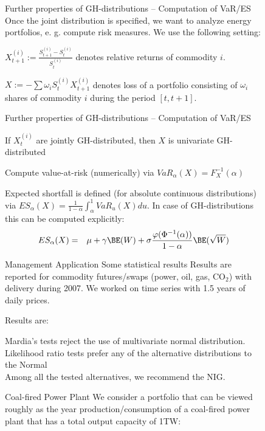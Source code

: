 \begin{figure}[htp]
\begin{center}
\par\end{center}

 Further properties of GH-distributions -- Computation of VaR/ES
Once the joint distribution is specified, we want to analyze energy
portfolios, e. g. compute risk measures. We use the following setting: 

$X_{t+1}^{(i)}:=\frac{S_{t+1}^{(i)}-S_{t}^{(i)}}{S_{t}^{(i)}}$ denotes
relative returns of commodity $i$. 

$X:=-\sum\omega_{i}S_{t}^{(i)}X_{t+1}^{(i)}$ denotes loss of a portfolio
consisting of $\omega_{i}$ shares of commodity $i$ during the period
$[t,t+1]$. 

 Further properties of GH-distributions -- Computation of VaR/ES 

If $X_{t}^{(i)}$ are jointly GH-distributed, then $X$ is univariate
GH-distributed 

Compute value-at-risk (numerically) via $VaR_{\alpha}(X)=F_{X}^{-1}(\alpha)$ 

Expected shortfall is defined (for absolute continuous distributions)
via $ES_{\alpha}(X)=\frac{1}{1-\alpha}\int_{\alpha}^{1}VaR_{u}(X)du$.
In case of GH-distributions this can be computed explicitly: 
\begin{eqnarray*}
ES_{\alpha}(X) & = & \mu+\gamma\BE(W)+\sigma\frac{\varphi(\Phi^{-1}(\alpha))}{1-\alpha}\BE(\sqrt{W})
\end{eqnarray*}




\subsubsectionRisk Management Application Some statistical results
Results are reported for commodity futures/swaps (power, oil, gas,
CO$_{2}$) with delivery during 2007. We worked on time series with
1.5 years of daily prices.

Results are: %


Mardia's tests reject the use of multivariate normal distribution.\\[-1.3cm] 

Likelihood ratio tests prefer any of the alternative distributions
to the Normal\\[-1.3cm] 

Among all the tested alternatives, we recommend the NIG. 



Coal-fired Power Plant We consider a portfolio that can be viewed
roughly as the year production/consumption of a coal-fired power plant
that has a total output capacity of 1TW: 


\end{figure}
